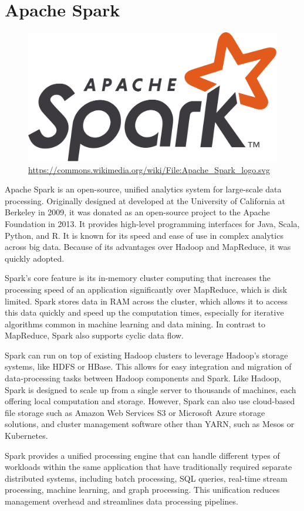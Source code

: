 \section{Apache Spark}

\begin{figure}
\begin{center}
\includegraphics[width=.25\textwidth]{spark_logo.png}
\tiny \url{https://commons.wikimedia.org/wiki/File:Apache_Spark_logo.svg} \normalsize
\end{center}
\end{figure}
Apache Spark is an open-source, unified analytics system for large-scale data processing. Originally designed at developed at the University of California at Berkeley in 2009, it was donated as an open-source project to the Apache Foundation in 2013. It provides high-level programming interfaces for Java, Scala, Python, and R. It is known for its speed and ease of use in complex analytics across big data. Because of its advantages over Hadoop and MapReduce, it was quickly adopted.

Spark's core feature is its in-memory cluster computing that increases the processing speed of an application significantly over MapReduce, which is disk limited. Spark stores data in RAM across the cluster, which allows it to access this data quickly and speed up the computation times, especially for iterative algorithms common in machine learning and data mining. In contrast to MapReduce, Spark also supports cyclic data flow.

Spark can run on top of existing Hadoop clusters to leverage Hadoop's storage systems, like HDFS or HBase. This allows for easy integration and migration of data-processing tasks between Hadoop components and Spark. Like Hadoop, Spark is designed to scale up from a single server to thousands of machines, each offering local computation and storage. However, Spark can also use cloud-based file storage such as Amazon Web Services S3 or Microsoft Azure storage solutions, and cluster management software other than YARN, such as Mesos or Kubernetes.

Spark provides a unified processing engine that can handle different types of workloads within the same application that have traditionally required separate distributed systems, including batch processing, SQL queries, real-time stream processing, machine learning, and graph processing. This unification reduces management overhead and streamlines data processing pipelines.

